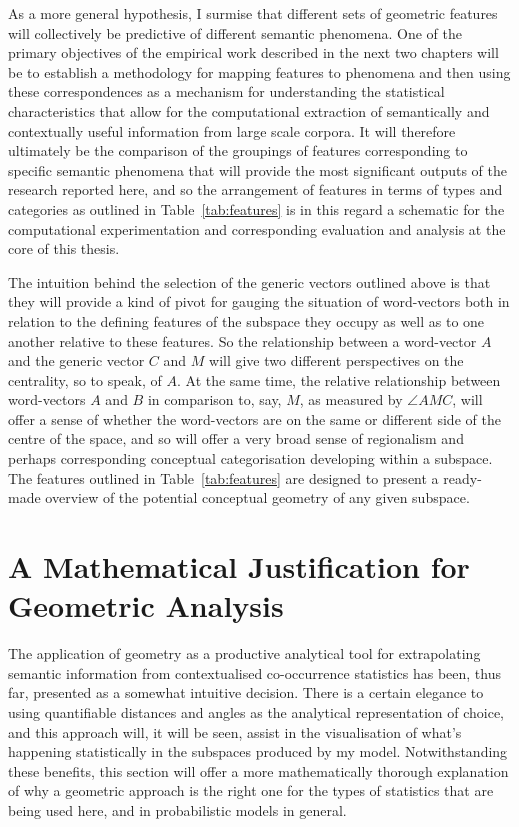 As a more general hypothesis, I surmise that different sets of geometric features will collectively be predictive of different semantic phenomena.  One of the primary objectives of the empirical work described in the next two chapters will be to establish a methodology for mapping features to phenomena and then using these correspondences as a mechanism for understanding the statistical characteristics that allow for the computational extraction of semantically and contextually useful information from large scale corpora.  It will therefore ultimately be the comparison of the groupings of features corresponding to specific semantic phenomena that will provide the most significant outputs of the research reported here, and so the arrangement of features in terms of types and categories as outlined in Table~\ref{tab:features} is in this regard a schematic for the computational experimentation and corresponding evaluation and analysis at the core of this thesis.

The intuition behind the selection of the generic vectors outlined above is that they will provide a kind of pivot for gauging the situation of word-vectors both in relation to the defining features of the subspace they occupy as well as to one another relative to these features.  So the relationship between a word-vector $A$ and the generic vector $C$ and $M$ will give two different perspectives on the centrality, so to speak, of $A$.  At the same time, the relative relationship between word-vectors $A$ and $B$ in comparison to, say, $M$, as measured by $\angle AMC$, will offer a sense of whether the word-vectors are on the same or different side of the centre of the space, and so will offer a very broad sense of regionalism and perhaps corresponding conceptual categorisation developing within a subspace.  The features outlined in Table~\ref{tab:features} are designed to present a ready-made overview of the potential conceptual geometry of any given subspace.

\section{A Mathematical Justification for Geometric Analysis} \label{sec:math}
The application of geometry as a productive analytical tool for extrapolating semantic information from contextualised co-occurrence statistics has been, thus far, presented as a somewhat intuitive decision.  There is a certain elegance to using quantifiable distances and angles as the analytical representation of choice, and this approach will, it will be seen, assist in the visualisation of what's happening statistically in the subspaces produced by my model.  Notwithstanding these benefits, this section will offer a more mathematically thorough explanation of why a geometric approach is the right one for the types of statistics that are being used here, and in probabilistic models in general.

